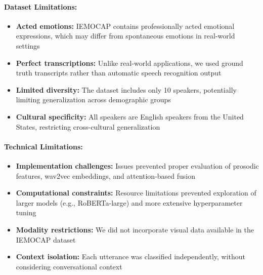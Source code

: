 \documentclass[12pt]{article}
\begin{document}
\paragraph{Dataset Limitations:}
\begin{itemize}
    \item \textbf{Acted emotions:} IEMOCAP contains professionally acted emotional expressions, which may differ from spontaneous emotions in real-world settings
    
    \item \textbf{Perfect transcriptions:} Unlike real-world applications, we used ground truth transcripts rather than automatic speech recognition output
    
    \item \textbf{Limited diversity:} The dataset includes only 10 speakers, potentially limiting generalization across demographic groups
    
    \item \textbf{Cultural specificity:} All speakers are English speakers from the United States, restricting cross-cultural generalization
\end{itemize}

\paragraph{Technical Limitations:}
\begin{itemize}
    \item \textbf{Implementation challenges:} Issues prevented proper evaluation of prosodic features, wav2vec embeddings, and attention-based fusion
    
    \item \textbf{Computational constraints:} Resource limitations prevented exploration of larger models (e.g., RoBERTa-large) and more extensive hyperparameter tuning
    
    \item \textbf{Modality restrictions:} We did not incorporate visual data available in the IEMOCAP dataset
    
    \item \textbf{Context isolation:} Each utterance was classified independently, without considering conversational context
\end{itemize}
\end{document}
